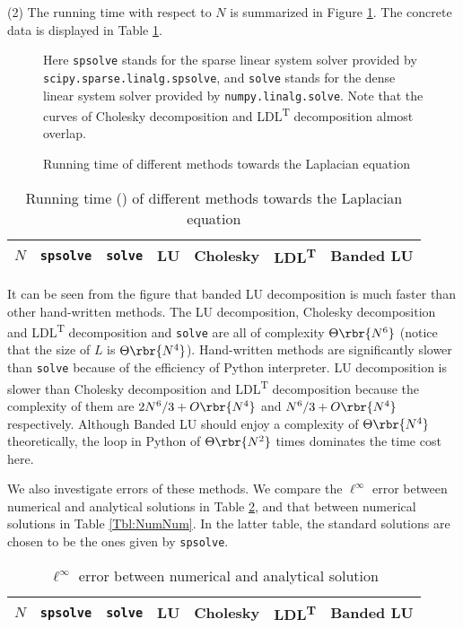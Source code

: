 \documentclass[english, nochinese]{pnote}
\begin{document}
(2) The running time with respect to $N$ is summarized in Figure \ref{Fig:Time}. The concrete data is displayed in Table \ref{Tbl:RunTime}.

\begin{figure}[htb]
{
\centering

\caption{Running time of different methods towards the Laplacian equation}
\label{Fig:Time}
}
{
\small
Here \verb"spsolve" stands for the sparse linear system solver provided by \verb"scipy.sparse.linalg.spsolve", and \verb"solve" stands for the dense linear system solver provided by \verb"numpy.linalg.solve". Note that the curves of Cholesky decomposition and LDL\textsuperscript{T} decomposition almost overlap.
}
\end{figure}
\begin{table}[htb]
\centering
\small
\begin{tabular}{|c|c|c|c|c|c|c|}
\hline
$N$ & \verb"spsolve" & \verb"solve" & LU & Cholesky & LDL\textsuperscript{T} & Banded LU \\
\hline

\end{tabular}
\caption{Running time () of different methods towards the Laplacian equation}
\label{Tbl:RunTime}
\end{table}

It can be seen from the figure that banded LU decomposition is much faster than other hand-written methods. The LU decomposition, Cholesky decomposition and LDL\textsuperscript{T} decomposition and \verb"solve" are all of complexity $ \Theta \rbr{N^6} $ (notice that the size of $L$ is $ \Theta \rbr{N^4} $). Hand-written methods are significantly slower than \verb"solve" because of the efficiency of Python interpreter. LU decomposition is slower than Cholesky decomposition and LDL\textsuperscript{T} decomposition because the complexity of them are $ 2 N^6 / 3 + O \rbr{N^4} $ and $ N^6 / 3 + O \rbr{N^4} $ respectively. Although Banded LU should enjoy a complexity of $ \Theta \rbr{N^4} $ theoretically, the loop in Python of $ \Theta \rbr{N^2} $ times dominates the time cost here.

We also investigate errors of these methods. We compare the $\ell^{\infty}$ error between numerical and analytical solutions in Table \ref{Tbl:NumAna}, and that between numerical solutions in Table \ref{Tbl:NumNum}. In the latter table, the standard solutions are chosen to be the ones given by \verb"spsolve".

\begin{table}[htb]
\centering
\small
\begin{tabular}{|c|c|c|c|c|c|c|}
\hline
$N$ & \verb"spsolve" & \verb"solve" & LU & Cholesky & LDL\textsuperscript{T} & Banded LU \\
\hline

\end{tabular}
\caption{$\ell^{\infty}$ error between numerical and analytical solution}
\label{Tbl:NumAna}
\end{table}
\end{document}
